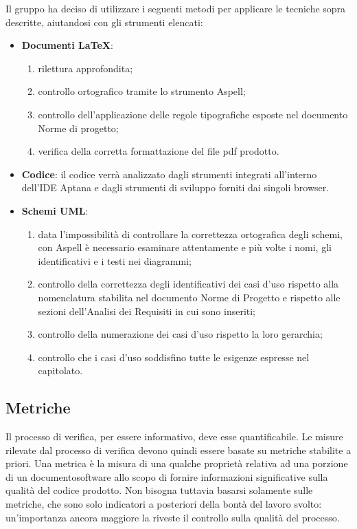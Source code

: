 Il gruppo ha deciso di utilizzare i seguenti metodi per applicare le tecniche sopra descritte, aiutandosi con gli strumenti elencati:
\begin{itemize}
\item \textbf{Documenti \LaTeX}:
\begin{enumerate}
\item rilettura approfondita;
\item controllo ortografico tramite lo strumento Aspell;
\item controllo dell'applicazione delle regole tipografiche esposte nel documento Norme di progetto;
\item verifica della corretta formattazione del file pdf prodotto.
\end{enumerate}

\item \textbf{Codice}: il codice verrà analizzato dagli strumenti integrati all'interno dell'IDE Aptana e dagli strumenti di sviluppo forniti dai singoli browser.

\item \textbf{Schemi UML}:
\begin{enumerate}
	\item data l'impossibilità di controllare la correttezza ortografica degli schemi, con Aspell è necessario esaminare attentamente e più volte i nomi, gli identificativi e i testi nei diagrammi;
	\item controllo della correttezza degli identificativi dei casi d'uso rispetto alla nomenclatura stabilita nel documento Norme di Progetto e rispetto alle sezioni dell'Analisi dei Requisiti in cui sono inseriti;
	\item controllo della numerazione dei casi d'uso rispetto la loro gerarchia;
	\item controllo che i casi d'uso soddisfino tutte le esigenze espresse nel capitolato.
\end{enumerate}
\end{itemize}
\subsection{Metriche}
Il processo di verifica, per essere informativo, deve esse quantificabile. Le misure rilevate dal processo di verifica devono quindi essere basate su metriche stabilite a priori.
Una metrica è la misura di una qualche proprietà relativa ad una porzione di un documentosoftware allo scopo di fornire informazioni significative sulla qualità del codice prodotto.
Non bisogna tuttavia basarsi solamente sulle metriche, che sono solo indicatori a posteriori della bontà del lavoro svolto: un'importanza ancora maggiore la riveste il controllo sulla qualità del processo.
